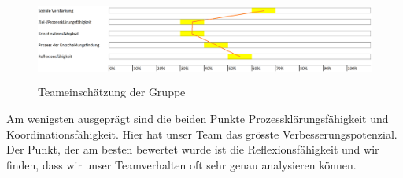 \begin{figure}[!h]
  \centering
    \includegraphics[height=2.8cm]{images/Gruppeneinsch.png}
  \caption{Teameinschätzung der Gruppe}
  \label{fig:excel}
\end{figure}


Am wenigsten ausgeprägt sind die beiden Punkte Prozessklärungsfähigkeit und Koordinationsfähigkeit. Hier hat unser Team das grösste Verbesserungspotenzial. Der Punkt, der am besten bewertet wurde ist die Reflexionsfähigkeit und wir finden, dass wir unser Teamverhalten oft sehr genau analysieren können. 

